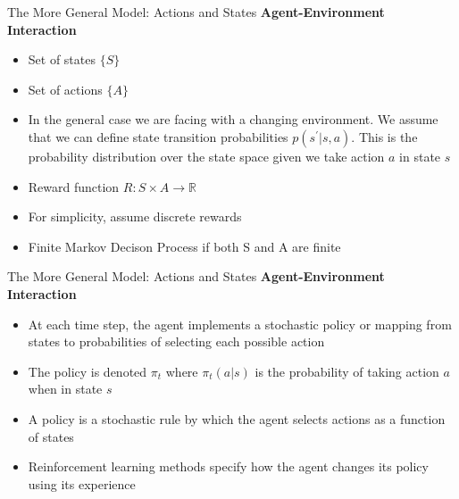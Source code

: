 \documentclass[11pt]{beamer}
\begin{document}
\begin{frame}{The More General Model: Actions and States }
\textbf{Agent-Environment Interaction}
	\begin{itemize}
		\item Set of states $\{S\}$
		\item Set of actions $\{A\}$
		\item In the general case we are facing with a changing environment. We assume that we can define state transition probabilities $p(s^\prime \vert s, a)$. This is the probability distribution over the state space given we take action $a$ in state $s$
		\item Reward function $R : S \times A \rightarrow \mathbb{R}$
		\item For simplicity, assume discrete rewards
		\item Finite Markov Decison Process if both S and A are finite
	\end{itemize}
\end{frame}
\begin{frame}{The More General Model: Actions and States }
\textbf{Agent-Environment Interaction}
	\begin{itemize}
		\item At each time step, the agent implements a stochastic policy or mapping from states to probabilities of selecting each possible action
		\item The policy is denoted $\pi_t$ where $\pi_t(a \vert s)$ is the probability of taking action $a$ when in state $s$
		\item A policy is a stochastic rule by which the agent selects actions as a function of states
		\item Reinforcement learning methods specify how the agent changes its policy using its experience
	\end{itemize}
\end{frame}
\end{document}
